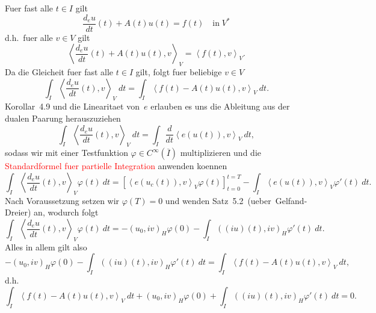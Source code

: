 \documentclass{article}
\begin{document}
Fuer fast alle $t \in I$ gilt
\begin{equation*}
  \frac{d_e u}{dt}(t) + A(t) u(t) 
  = f(t) \quad \text{in} \; V^*
\end{equation*}
d.h.\ fuer alle $v \in V$ gilt
\begin{equation*}
  {\left\langle \frac{d_e u}{dt}(t) + A(t) u(t), v \right\rangle}_V
  =  {\left\langle f(t), v \right\rangle}_V.
\end{equation*}
Da die Gleicheit fuer fast alle $t \in I$ gilt, folgt fuer beliebige $v \in V$
\begin{equation*}
  \int_{I} {\left\langle \frac{d_e u}{dt}(t), v \right\rangle}_V \ dt
  =  \int_{I} {\left\langle f(t) - A(t) u(t), v \right\rangle}_V \ dt.
\end{equation*}
Korollar~4.9 und die Linearitaet von~$e$ erlauben es uns die Ableitung aus der dualen Paarung herauszuziehen
\begin{equation*}
  \int_{I} {\left\langle \frac{d_e u}{dt}(t), v \right\rangle}_V \ dt
  = \int_{I} \frac{d}{dt} {\left\langle e(u(t)), v \right\rangle}_V \ dt,
\end{equation*}
sodass wir mit einer Testfunktion $\varphi \in C^\infty(\overline{I})$ multiplizieren und die \textcolor{red}{Standardformel fuer partielle Integration} anwenden koennen
\begin{equation*}
  \int_{I} {\left\langle \frac{d_e u}{dt}(t), v \right\rangle}_V \varphi(t) \ dt
  = {\left[ {\left\langle e(u_c(t)), v \right\rangle}_V \varphi(t) \right]}_{t=0}^{t = T}
  - \int_{I} {\left\langle e(u(t)), v \right\rangle}_V \varphi'(t) \ dt.
\end{equation*}
Nach Voraussetzung setzen wir $\varphi(T) = 0$ und wenden Satz~5.2~(ueber~Gelfand-Dreier) an, wodurch folgt
\begin{equation*}
  \int_{I} {\left\langle \frac{d_e u}{dt}(t), v \right\rangle}_V \varphi(t) \ dt
  = - {(u_0, iv)}_H \varphi(0)
  - \int_{I} {((iu)(t), iv)}_H \varphi'(t) \ dt.
\end{equation*}
Alles in allem gilt also
\begin{equation*}
  - {(u_0, iv)}_H \varphi(0)
  - \int_{I} {((iu)(t), iv)}_H \varphi'(t) \ dt
  = \int_{I} {\left\langle f(t) - A(t) u(t), v \right\rangle}_V \ dt,
\end{equation*}
d.h.
\begin{equation*}
  \int_{I} {\left\langle f(t) - A(t) u(t), v \right\rangle}_V \ dt
  + {(u_0, iv)}_H \varphi(0)
  + \int_{I} {((iu)(t), iv)}_H \varphi'(t) \ dt
  = 0.
\end{equation*}
\end{document}
